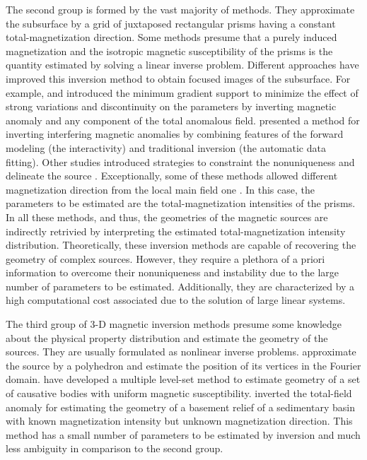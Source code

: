 The second group is formed by the vast majority of methods. 
They approximate the subsurface by a grid of juxtaposed rectangular prisms having 
a constant total-magnetization direction. Some methods presume that a purely induced 
magnetization \cite[e.g., ][]{cribb-1976,li_3-d_1996,pilkington_3-d_1997} and the 
isotropic magnetic susceptibility of the prisms is the quantity estimated by solving 
a linear inverse problem. Different approaches have improved this inversion method to obtain focused images of the subsurface. For example, \cite{portniaguine_focusing_1999} and \cite{portniaguine_3d_2002} introduced the minimum gradient support to minimize the effect of strong variations and discontinuity on the parameters by inverting magnetic anomaly and any component of the total anomalous field. \cite{barbosa_interactive_2006} presented a method for inverting interfering magnetic anomalies by combining  features of the forward modeling (the interactivity) and traditional inversion (the automatic data fitting). Other studies introduced strategies to constraint the nonuniqueness and delineate the source \cite[]{tontini,pilkington_3d_2009,shamsipour_3d_2011,cella_inversion_2012,abedi-2015}. Exceptionally, some of these methods allowed different magnetization direction from the local main field one \cite[e.g., ][]{pignatelli-2006}. 
In this case, the parameters to be estimated are the total-magnetization intensities 
of the prisms. 
In all these methods, and thus, the geometries of the magnetic sources are indirectly retrivied by interpreting the estimated total-magnetization intensity 
distribution. 
Theoretically, these inversion methods are capable of recovering the geometry of complex 
sources. However, they require a plethora of a priori information to overcome 
their nonuniqueness and instability due to the large number of parameters 
to be estimated. Additionally, they are characterized by a high 
computational cost associated due to the solution of large linear systems.

The third group of 3-D magnetic inversion methods presume some knowledge about the 
physical property distribution and estimate the geometry of the sources. 
They are usually formulated as nonlinear inverse problems. 
\cite{wang_inversion_1990} approximate the source by a polyhedron and estimate 
the position of its vertices in the Fourier domain. 
\cite{wenbin-2017} have developed a multiple level-set method to estimate geometry 
of a set of causative bodies with uniform magnetic susceptibility. \cite{hidalgo-2019} inverted the total-field anomaly for estimating the geometry of a basement relief of a sedimentary basin with known magnetization intensity but unknown magnetization direction. 
This method has a small number of parameters to be estimated by inversion and 
much less ambiguity in comparison to the second group. 

